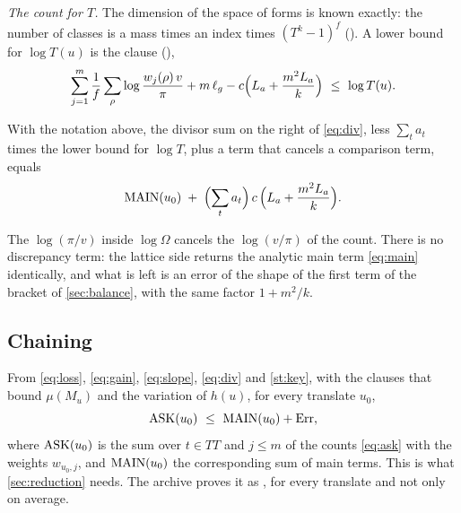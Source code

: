 \emph{The count for $T$.} The dimension of the space of forms is known exactly: the number of
classes is a mass times an index times $(T^k-1)^f$ \lvS{} (\textsubscript{}). A
lower bound for $\log T(u)$ is the clause \lvS{}
(),
\[
\sum_{j=1}^m\frac1f\sum_{\rho}\log\frac{w_j(\rho)\,v}{\pi}+m\,\ell_g-c\Bigl(L_a+\frac{m^2L_a}{k}\Bigr)\ \le\ \log T(u).
\]

\begin{statement}\label{st:key}
With the notation above, the divisor sum on the right of \eqref{eq:div}, less $\sum_ta_t$
times the lower bound for $\log T$, plus a term that cancels a comparison term, equals
\[
\mathrm{MAIN}(u_0)\;+\;\Bigl(\sum_ta_t\Bigr)\,c\,\Bigl(L_a+\frac{m^2L_a}{k}\Bigr).
\]
\end{statement}
The $\log(\pi/v)$ inside $\log\Omega$ cancels the $\log(v/\pi)$ of the count. There is no
discrepancy term: the lattice side returns the analytic main term \eqref{eq:main} identically,
and what is left is an error of the shape of the first term of the bracket of
\cref{sec:balance}, with the same factor $1+m^2/k$.

\subsection{Chaining}
From \eqref{eq:loss}, \eqref{eq:gain}, \eqref{eq:slope}, \eqref{eq:div} and \cref{st:key},
with the clauses that bound $\mu(M_u)$ and the variation of $h(u)$, for every translate $u_0$,
\[
\mathrm{ASK}(u_0)\ \le\ \mathrm{MAIN}(u_0)+\mathrm{Err} ,
\]
where $\mathrm{ASK}(u_0)$ is the sum over $t\in TT$ and $j\le m$ of the counts \eqref{eq:ask} with the
weights $w_{u_0,j}$, and $\mathrm{MAIN}(u_0)$ the corresponding sum of main terms. This is what
\cref{sec:reduction} needs. The archive proves it as
 \lvM, for every translate and not only on average.
